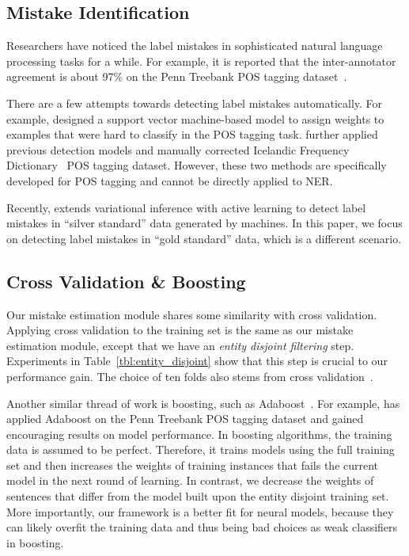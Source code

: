 \documentclass[11pt,a4paper]{article}
\begin{document}
\subsection{Mistake Identification}
Researchers have noticed the label mistakes in sophisticated natural language processing tasks for a while.
    For example, it is reported that the inter-annotator agreement is about 97\% on the Penn Treebank POS tagging dataset~\cite{manning2011part, subramanya2010efficient}.
    
    There are a few attempts towards detecting label mistakes automatically.
    For example, \citet{nakagawa2002detecting} designed a support vector machine-based model to assign weights to examples that were hard to classify in the POS tagging task.
    \citet{loftsson2009correcting} further applied previous detection models and manually corrected Icelandic Frequency Dictionary~\cite{pind1991islensk} POS tagging dataset.
    However, these two methods are specifically developed for POS tagging and cannot be directly applied to NER. 
    
    Recently, \citet{rehbein2017detecting} extends variational inference with active learning to detect label mistakes in ``silver standard'' data generated by machines.
    In this paper, we focus on detecting label mistakes in ``gold standard'' data, which is a different scenario.






\subsection{Cross Validation \& Boosting}
    Our mistake estimation module shares some similarity with cross validation. Applying cross validation to the training set is the same as our mistake estimation module, except that we have an \textit{entity disjoint filtering} step. Experiments in Table~\ref{tbl:entity_disjoint} show that this step is crucial to our performance gain. The choice of ten folds also stems from cross validation~\cite{kohavi1995study}.


    Another similar thread of work is boosting, such as Adaboost~\cite{freund1999short, schapire1999improved}. 
    For example, \citet{abney1999boosting} has applied Adaboost on the Penn Treebank POS tagging dataset and gained encouraging results on model performance.
    In boosting algorithms, the training data is assumed to be perfect.
    Therefore, it trains models using the full training set and then increases the weights of training instances that fails the current model in the next round of learning.
    In contrast, we decrease the weights of sentences that differ from the model built upon the entity disjoint training set.
    More importantly, our framework is a better fit for neural models, because they can likely overfit the training data and thus being bad choices as weak classifiers in boosting.
\end{document}
